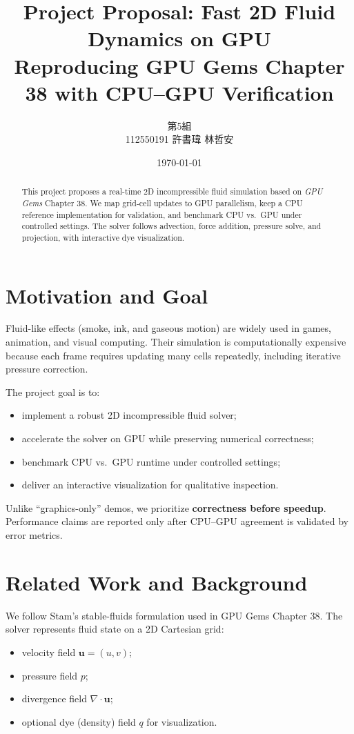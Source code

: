 \documentclass[10pt,a4paper]{article}
\title{\textbf{Project Proposal: Fast 2D Fluid Dynamics on GPU}\\
\large Reproducing GPU Gems Chapter 38 with CPU--GPU Verification}
\author{第5組\\
112550191 \quad 許書瑋 \qquad 112550052 \quad 林哲安}
\date{\today}
\begin{document}
\maketitle
\thispagestyle{empty}

\begin{abstract}
This project proposes a real-time 2D incompressible fluid simulation based on \textit{GPU Gems} Chapter 38. We map grid-cell updates to GPU parallelism, keep a CPU reference implementation for validation, and benchmark CPU vs.\ GPU under controlled settings. The solver follows advection, force addition, pressure solve, and projection, with interactive dye visualization.
\end{abstract}

\section{Motivation and Goal}
Fluid-like effects (smoke, ink, and gaseous motion) are widely used in games, animation, and visual computing. Their simulation is computationally expensive because each frame requires updating many cells repeatedly, including iterative pressure correction.

The project goal is to:
\begin{itemize}
    \item implement a robust 2D incompressible fluid solver;
    \item accelerate the solver on GPU while preserving numerical correctness;
    \item benchmark CPU vs.\ GPU runtime under controlled settings;
    \item deliver an interactive visualization for qualitative inspection.
\end{itemize}

Unlike ``graphics-only'' demos, we prioritize \textbf{correctness before speedup}. Performance claims are reported only after CPU--GPU agreement is validated by error metrics.

\section{Related Work and Background}
We follow Stam's stable-fluids formulation used in GPU Gems Chapter 38. The solver represents fluid state on a 2D Cartesian grid:
\begin{itemize}
    \item velocity field $\mathbf{u} = (u,v)$;
    \item pressure field $p$;
    \item divergence field $\nabla \cdot \mathbf{u}$;
    \item optional dye (density) field $q$ for visualization.
\end{itemize}
\end{document}
